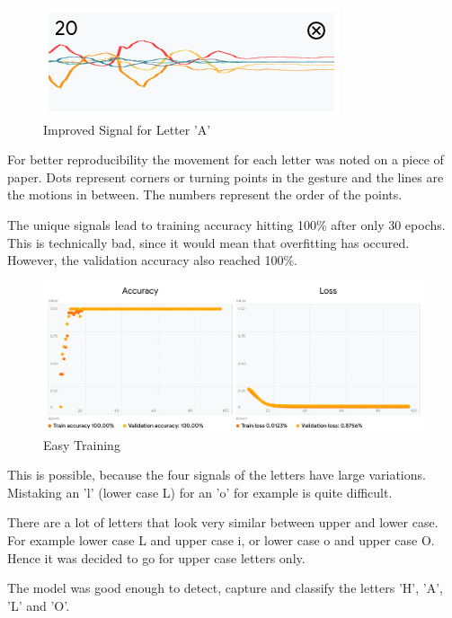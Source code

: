 \documentclass[a4paper,titlepage]{article}
\begin{document}
\begin{figure}[H]
    \includegraphics[width=\textwidth]{better_signal_A.png}
    \caption{Improved Signal for Letter 'A'}
\end{figure}

For better reproducibility the movement for each letter was noted on a piece of paper.
Dots represent corners or turning points in the gesture and the lines are the motions in between.
The numbers represent the order of the points.

The unique signals lead to training accuracy hitting 100\% after only 30 epochs.
This is technically bad, since it would mean that overfitting has occured.
However, the validation accuracy also reached 100\%.

\begin{figure}[H]
    \includegraphics[width=\textwidth]{very_fast_training_reults_HALO.png}
    \caption{Easy Training}
\end{figure}

\newpage
This is possible, because the four signals of the letters have large variations.
Mistaking an 'l' (lower case L) for an 'o' for example is quite difficult.

There are a lot of letters that look very similar between upper and lower case.
For example lower case L and upper case i, or lower case o and upper case O.
Hence it was decided to go for upper case letters only.

The model was good enough to detect, capture and classify the letters 'H', 'A', 'L' and 'O'.
\end{document}
